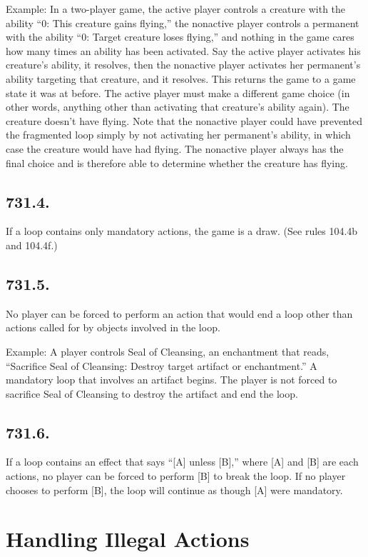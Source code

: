 Example: In a two-player game, the active player controls a creature with the ability “{0}: This creature gains flying,” the nonactive player controls a permanent with the ability “{0}: Target creature loses flying,” and nothing in the game cares how many times an ability has been activated. Say the active player activates his creature’s ability, it resolves, then the nonactive player activates her permanent’s ability targeting that creature, and it resolves. This returns the game to a game state it was at before. The active player must make a different game choice (in other words, anything other than activating that creature’s ability again). The creature doesn’t have flying. Note that the nonactive player could have prevented the fragmented loop simply by not activating her permanent’s ability, in which case the creature would have had flying. The nonactive player always has the final choice and is therefore able to determine whether the creature has flying.

\subsection*{731.4.}
If a loop contains only mandatory actions, the game is a draw. (See rules 104.4b and 104.4f.)

\subsection*{731.5.}
No player can be forced to perform an action that would end a loop other than actions called for by objects involved in the loop.

Example: A player controls Seal of Cleansing, an enchantment that reads, “Sacrifice Seal of Cleansing: Destroy target artifact or enchantment.” A mandatory loop that involves an artifact begins. The player is not forced to sacrifice Seal of Cleansing to destroy the artifact and end the loop.

\subsection*{731.6.}
If a loop contains an effect that says “[A] unless [B],” where [A] and [B] are each actions, no player can be forced to perform [B] to break the loop. If no player chooses to perform [B], the loop will continue as though [A] were mandatory.

\section{Handling Illegal Actions}
